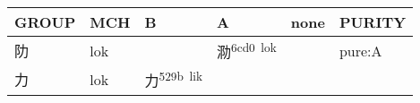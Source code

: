 \documentclass[14pt,a4paper]{scrartcl}
\begin{document}
\begin{longtable}[c]{@{}llllll@{}}
\toprule
\begin{minipage}[b]{0.14\columnwidth}\raggedright\strut
GROUP
\strut\end{minipage} &
\begin{minipage}[b]{0.14\columnwidth}\raggedright\strut
MCH
\strut\end{minipage} &
\begin{minipage}[b]{0.14\columnwidth}\raggedright\strut
B
\strut\end{minipage} &
\begin{minipage}[b]{0.14\columnwidth}\raggedright\strut
A
\strut\end{minipage} &
\begin{minipage}[b]{0.14\columnwidth}\raggedright\strut
none
\strut\end{minipage} &
\begin{minipage}[b]{0.14\columnwidth}\raggedright\strut
PURITY
\strut\end{minipage}\tabularnewline
\midrule
\endhead
\begin{minipage}[t]{0.14\columnwidth}\raggedright\strut
阞
\strut\end{minipage} &
\begin{minipage}[t]{0.14\columnwidth}\raggedright\strut
lok
\strut\end{minipage} &
\begin{minipage}[t]{0.14\columnwidth}\raggedright\strut
\strut\end{minipage} &
\begin{minipage}[t]{0.14\columnwidth}\raggedright\strut
泐\textsuperscript{6cd0~lok}
\strut\end{minipage} &
\begin{minipage}[t]{0.14\columnwidth}\raggedright\strut
\strut\end{minipage} &
\begin{minipage}[t]{0.14\columnwidth}\raggedright\strut
pure:A
\strut\end{minipage}\tabularnewline
\begin{minipage}[t]{0.14\columnwidth}\raggedright\strut
力
\strut\end{minipage} &
\begin{minipage}[t]{0.14\columnwidth}\raggedright\strut
lok
\strut\end{minipage} &
\begin{minipage}[t]{0.14\columnwidth}\raggedright\strut
力\textsuperscript{529b~lik}
\strut\end{minipage} &

\end{longtable}
\end{document}
